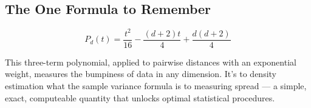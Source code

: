\documentclass[12pt]{article}
\begin{document}
\subsection{The One Formula to Remember}

$$P_d(t) = \frac{t^2}{16} - \frac{(d+2)t}{4} + \frac{d(d+2)}{4}$$

This three-term polynomial, applied to pairwise distances with an exponential weight, measures the bumpiness of data in any dimension. It's to density estimation what the sample variance formula is to measuring spread --- a simple, exact, computeable quantity that unlocks optimal statistical procedures.
\end{document}
